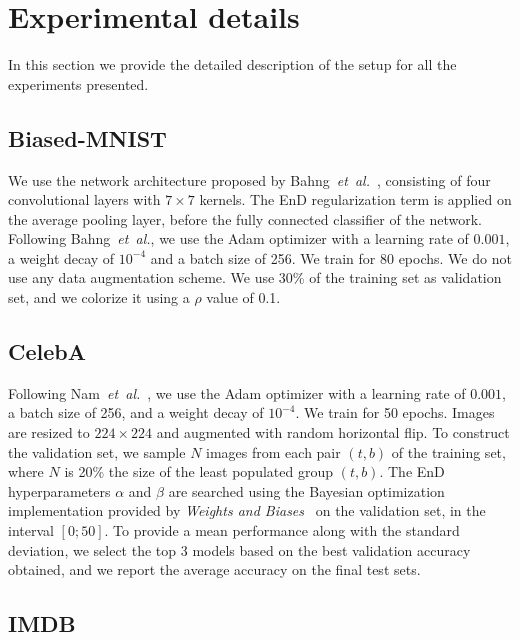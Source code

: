 \section{Experimental details}
\label{appendix:experiments-details}

In this section we provide the detailed description of the setup for all the experiments presented.

\subsection{Biased-MNIST}
We use the network architecture proposed by Bahng~\emph{et~al.}~\cite{bahng2019rebias}, consisting of four convolutional layers with $7 \times 7$ kernels. The EnD regularization term is applied on the average pooling layer, before the fully connected classifier of the network. 
Following Bahng~\emph{et~al.}, we use the Adam optimizer with a learning rate of $0.001$, a weight decay of $10^{-4}$ and a batch size of 256. 
We train for 80 epochs. We do not use any data augmentation scheme. We use 30\% of the training set as validation set, and we colorize it using a $\rho$ value of 0.1.


\subsection{CelebA}

Following Nam~\emph{et~al.}~\cite{nam2020learning}, we use the Adam optimizer with a learning rate of $0.001$, a batch size of 256, and a weight decay of $10^{-4}$. We train for 50 epochs. Images are resized to $224\times224$ and augmented with random horizontal flip. To construct the validation set, we sample $N$ images from each pair $(t, b)$ of the training set, where $N$ is 20\% the size of the least populated group $(t, b)$. 
The EnD hyperparameters $\alpha$ and $\beta$ are searched using the Bayesian optimization~\cite{snoek2012practical} implementation provided by \emph{Weights and Biases}~\cite{wandb} on the validation set, in the interval $[0;50]$.
To provide a mean performance along with the standard deviation, we select the top 3 models based on the best validation accuracy obtained, and we report the average accuracy on the final test sets.

\subsection{IMDB}

